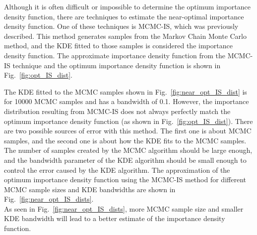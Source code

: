     Although it is often difficult or impossible to determine the optimum importance density function, there are techniques to estimate the near-optimal importance density function. One of these techniques is MCMC-IS, which was previously described. This method generates samples from the Markov Chain Monte Carlo method, and the KDE fitted to those samples is considered the importance density function. The approximate importance density function from the MCMC-IS technique and the optimum importance density function is shown in Fig.~\ref{fig:opt_IS_dist}.

    
    
    The KDE fitted to the MCMC samples shown in Fig.~\ref{fig:near_opt_IS_dist} is for 10000 MCMC samples and has a bandwidth of 0.1. However, the importance distribution resulting from MCMC-IS does not always perfectly match the optimum importance density function (as shown in Fig.~\ref{fig:opt_IS_dist}). There are two possible sources of error with this method. The first one is about MCMC samples, and the second one is about how the KDE fits to the MCMC samples. The number of samples created by the MCMC algorithm should be large enough, and the bandwidth parameter of the KDE algorithm should be small enough to control the error caused by the KDE algorithm. The approximation of the optimum importance density function using the MCMC-IS method for different MCMC sample sizes and KDE bandwidths are shown in Fig.~\ref{fig:near_opt_IS_dists}.\\

    

    As seen in Fig.~\ref{fig:near_opt_IS_dists}, more MCMC sample size and smaller KDE bandwidth will lead to a better estimate of the importance density function. 
    

